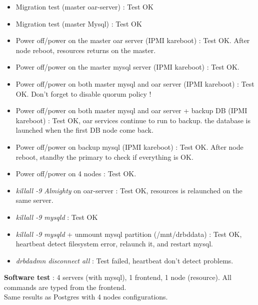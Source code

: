 \documentclass[a4paper,10pt]{report}
\begin{document}
\begin{itemize}
 \item Migration test (master oar-server) : Test OK
 \item Migration test (master Mysql) : Test OK
 \item Power off/power on the master oar server (IPMI kareboot) : Test OK. After node reboot, resources returns on the master.
 \item Power off/power on the master mysql server (IPMI kareboot) : Test OK.
 \item Power off/power on both master mysql and oar server (IPMI kareboot) : Test OK. Don't forget to disable quorum policy !
 \item Power off/power on both master mysql and oar server + backup DB (IPMI kareboot) : Test OK, oar services continue to run to backup. the database is launched when the first DB node come back.
 \item Power off/power on backup mysql (IPMI kareboot) : Test OK. After node reboot, standby the primary to check if everything is OK.
 \item Power off/power on 4 nodes : Test OK.
 \item \textit{killall -9 Almighty} on oar-server : Test OK, resources is relaunched on the same server.
 \item \textit{killall -9 mysqld} : Test OK
 \item \textit{killall -9 mysqld} + unmount mysql partition (/mnt/drbddata) : Test OK, heartbeat detect filesystem error, relaunch it, and restart mysql.
 \item \textit{drbdadmn disconnect all} : Test failed, heartbeat don't detect problems.
\end{itemize}

\textbf{Software test} : 4 servers (with mysql), 1 frontend, 1 node (resource). All commands are typed from the frontend.\\
Same results as Postgres with 4 nodes configurations.


















\appendix
\end{document}

